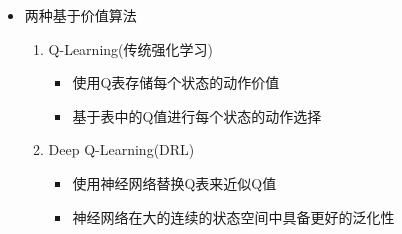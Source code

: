 \documentclass[UTF8]{ctexart}
\begin{document}
\begin{itemize}
    \item 两种基于价值算法
    \begin{enumerate}
        \item Q-Learning(传统强化学习)
        \begin{itemize}
            \item 使用Q表存储每个状态的动作价值
            \item 基于表中的Q值进行每个状态的动作选择
        \end{itemize}
        \item Deep Q-Learning(DRL)
        \begin{itemize}
            \item 使用神经网络替换Q表来近似Q值
            \item 神经网络在大的连续的状态空间中具备更好的泛化性
        \end{itemize}
    \end{enumerate}
\end{itemize}
\end{document}
